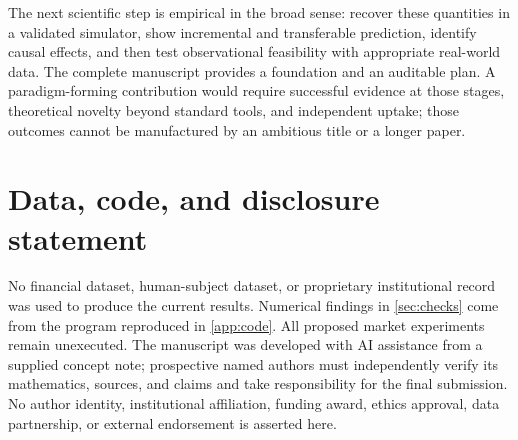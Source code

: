 \documentclass[11pt,a4paper]{article}
\theoremstyle{definition}
\theoremstyle{remark}
\begin{document}
The next scientific step is empirical in the broad sense: recover these quantities in a validated simulator, show incremental and transferable prediction, identify causal effects, and then test observational feasibility with appropriate real-world data. The complete manuscript provides a foundation and an auditable plan. A paradigm-forming contribution would require successful evidence at those stages, theoretical novelty beyond standard tools, and independent uptake; those outcomes cannot be manufactured by an ambitious title or a longer paper.

\section*{Data, code, and disclosure statement}
No financial dataset, human-subject dataset, or proprietary institutional record was used to produce the current results. Numerical findings in \cref{sec:checks} come from the program reproduced in \cref{app:code}. All proposed market experiments remain unexecuted. The manuscript was developed with AI assistance from a supplied concept note; prospective named authors must independently verify its mathematics, sources, and claims and take responsibility for the final submission. No author identity, institutional affiliation, funding award, ethics approval, data partnership, or external endorsement is asserted here.
\end{document}
